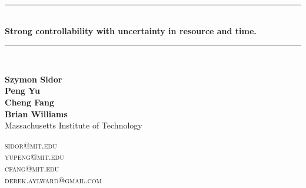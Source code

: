 \documentclass{article}
\newcommand{\HRule}{\rule{\linewidth}{0.5mm}}
\begin{document}
\thispagestyle{empty}

\begin{center}
\HRule \\[0.3cm]
{\Large \bfseries Strong controllability with uncertainty in resource and time. \\[0.3cm]}
\HRule \\[0.5cm]

\noindent
\begin{minipage}{0.5\textwidth}
\begin{flushleft}
\textbf{Szymon Sidor\\
Peng Yu\\
Cheng Fang\\
Brian Williams}\\
Massachusetts Institute of Technology
\end{flushleft}
\end{minipage}%
\begin{minipage}{0.5\textwidth}
\begin{flushright}
\textsc{sidor@mit.edu}\\
\textsc{yupeng@mit.edu}\\
\textsc{cfang@mit.edu}\\
\textsc{derek.aylward@gmail.com}\\
$\ $
\end{flushright}
\end{minipage}
\\[1cm]
\end{center}
\pagestyle{fancy}
\end{document}
